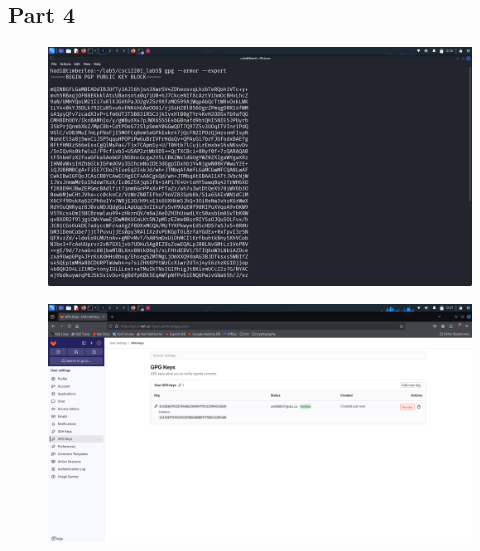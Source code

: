 \documentclass{article}
\numberwithin{equation}{subsection}
\begin{document}
	\newpage
	\subsection{Part 4}
		\begin{figure}[H]
		\includegraphics[width=430pt]{pics/Screenshot_2025-03-07_12_26_47.png}
	\end{figure}
	\begin{figure}[H]
		\includegraphics[width=430pt]{pics/Screenshot_2025-03-07_12_27_37.png}
	\end{figure}

	\newpage
\end{document}
